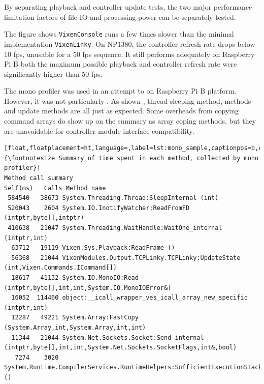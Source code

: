 By separating playback and controller update tests, the two major performance limitation factors of file IO and processing power can be separately tested.

The figure shows  \texttt{VixenConsole} runs a few times slower than the minimal implementation \texttt{VixenLinky}. On  NP1380, the controller refresh rate drops below 10 fps, unusable for a 50 fps sequence. It still performs adequately on  Raspberry Pi B\ca{;} both the maximum possible playback and controller refresh rate were significantly higher than 50 fps.


The mono profiler was used in an attempt to  on  Raspberry Pi B platform. However, it was not particularly . As shown  ,  thread sleeping method,  methods and update methods are all  just as expected. Some overheads from copying command arrays do show up on the summary as array coping methods, but they are  unavoidable for controller module interface compatibility.

\begin{lstlisting}[float,floatplacement=ht,language=,label=lst:mono_sample,captionpos=b,caption={\footnotesize Summary of time spent in each method, collected by mono profiler}]
Method call summary
Self(ms)   Calls Method name
 584540   38673 System.Threading.Thread:SleepInternal (int)
 520043    2604 System.IO.InotifyWatcher:ReadFromFD (intptr,byte[],intptr)
 410638   21047 System.Threading.WaitHandle:WaitOne_internal (intptr,int)
  63712   19119 Vixen.Sys.Playback:ReadFrame ()
  56368   21044 VixenModules.Output.TCPLinky.TCPLinky:UpdateState (int,Vixen.Commands.ICommand[])
  18617   41132 System.IO.MonoIO:Read (intptr,byte[],int,int,System.IO.MonoIOError&)
  16052  114460 object:__icall_wrapper_ves_icall_array_new_specific (intptr,int)
  12287   49221 System.Array:FastCopy (System.Array,int,System.Array,int,int)
  11344   21044 System.Net.Sockets.Socket:Send_internal (intptr,byte[],int,int,System.Net.Sockets.SocketFlags,int&,bool)
   7274    3020 System.Runtime.CompilerServices.RuntimeHelpers:SufficientExecutionStack ()
\end{lstlisting}

